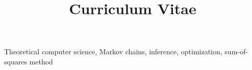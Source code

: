 \documentclass[a4paper,skipsamekey,11pt,english]{curve}
\title{Curriculum Vitae}
\begin{document}
\makeheaders[c]


\vspace{-2mm}
Theoretical computer science, Markov chains, inference, optimization, sum-of-squares method




\vspace{-4mm}


\vspace{-2mm}

\vspace{-2mm}



\vspace{-2mm}






% 
\end{document}
